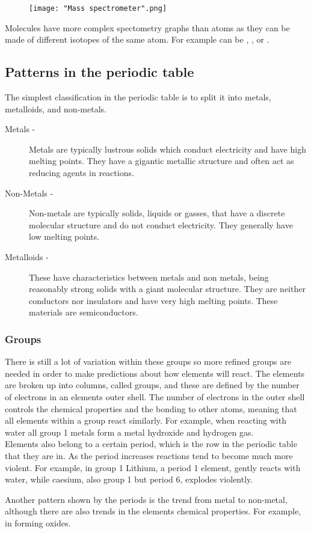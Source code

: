 \documentclass[a4paper, 12pt]{article}
\begin{document}
	\begin{figure}[h]
		\texttt{[image: "Mass spectrometer".png]}
	\end{figure}

	Molecules have more complex spectometry graphs than atoms as they can be made of different isotopes of the same atom. For example  can be , , or .

	\subsection{Patterns in the periodic table}
	The simplest classification in the periodic table is to split it into metals, metalloids, and non-metals.
	\begin{description}
		\item[Metals - ] Metals are typically lustrous solids which conduct electricity and have high melting points. They have a gigantic metallic structure and often act as reducing agents in reactions.
		\item [Non-Metals - ] Non-metals are typically solids, liquids or gasses, that have a discrete molecular structure and do not conduct electricity. They generally have low melting points.
		\item [Metalloids - ] These have characteristics between metals and non metals, being reasonably strong solids with a giant molecular structure. They are neither conductors nor insulators and have very high melting points. These materials are semiconductors.
	\end{description}
	
	\subsubsection*{Groups}
	There is still a lot of variation within these groups so more refined groups are needed in order to make predictions about how elements will react. The elements are broken up into columns, called groups, and these are defined by the number of electrons in an elements outer shell. The number of electrons in the outer shell controls the chemical properties and the bonding to other atoms, meaning that all elements within a group react similarly. For example, when reacting with water all group 1 metals form a metal hydroxide and hydrogen gas. \\
Elements also belong to a certain period, which is the row in the periodic table that they are in. As the period increases reactions tend to become much more violent. For example, in group 1 Lithium, a period 1 element, gently reacts with water, while caesium, also group 1 but period 6, explodes violently. \\
	\par
	Another pattern shown by the periods is the trend from metal to non-metal, although there are also trends in the elements chemical properties. For example, in forming oxides. \\
\end{document}
